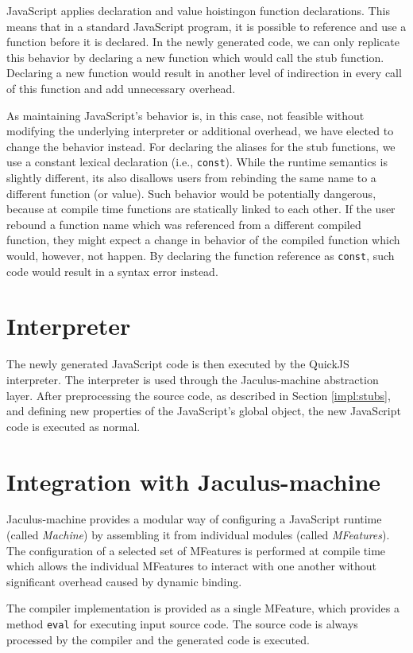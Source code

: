 JavaScript applies declaration and value hoisting\footnotemark[2] on function declarations. This means that in a standard JavaScript program, it is possible to reference and use a function before it is declared. In the newly generated code, we can only replicate this behavior by declaring a new function which would call the stub function. Declaring a new function would result in another level of indirection in every call of this function and add unnecessary overhead.


As maintaining JavaScript's behavior is, in this case, not feasible without modifying the underlying interpreter or additional overhead, we have elected to change the behavior instead. For declaring the aliases for the stub functions, we use a constant lexical declaration (i.e., \texttt{const}). While the runtime semantics is slightly different, its also disallows users from rebinding the same name to a different function (or value). Such behavior would be potentially dangerous, because at compile time functions are statically linked to each other. If the user rebound a function name which was referenced from a different compiled function, they might expect a change in behavior of the compiled function which would, however, not happen. By declaring the function reference as \texttt{const}, such code would result in a syntax error instead.


\section{Interpreter}

The newly generated JavaScript code is then executed by the QuickJS interpreter. The interpreter is used through the Jaculus-machine abstraction layer. After preprocessing the source code, as described in Section \ref{impl:stubs}, and defining new properties of the JavaScript's global object, the new JavaScript code is executed as normal.

\section{Integration with Jaculus-machine}

Jaculus-machine provides a modular way of configuring a JavaScript runtime (called \textit{Machine}) by assembling it from individual modules (called \textit{MFeatures}). The configuration of a selected set of MFeatures is performed at compile time which allows the individual MFeatures to interact with one another without significant overhead caused by dynamic binding.

The compiler implementation is provided as a single MFeature, which provides a method \texttt{eval} for executing input source code. The source code is always processed by the compiler and the generated code is executed.
